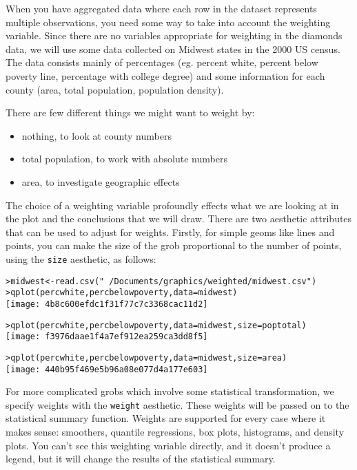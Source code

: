 When you have aggregated data where each row in the dataset represents multiple observations, you need some way to take into account the weighting variable.  Since there are no variables appropriate for weighting in the diamonds data, we will use some data collected on Midwest states in the 2000 US census.  The data consists mainly of percentages (eg. percent white, percent below poverty line, percentage with college degree) and some information for each county (area, total population, population density).

There are few different things we might want to weight by: 

\begin{itemize}
	\item nothing, to look at county numbers
	\item total population, to work with absolute numbers
	\item area, to investigate geographic effects
\end{itemize}

\noindent The choice of a weighting variable profoundly effects what we are looking at in the plot and the conclusions that we will draw.  There are two aesthetic attributes that can be used to adjust for weights.  Firstly, for simple geoms like lines and points, you can make the size of the grob proportional to the number of points, using the {\tt size} aesthetic, as follows:

\begin{alltt}
> midwest <- read.csv("~/Documents/graphics/weighted/midwest.csv")
> qplot(percwhite, percbelowpoverty, data = midwest)
\texttt{[image: 4b8c600efdc1f31f77c7c3368cac11d2]}

> qplot(percwhite, percbelowpoverty, data = midwest, size = poptotal)
\texttt{[image: f3976daae1f4a7ef912ea259ca3dd8f5]}

> qplot(percwhite, percbelowpoverty, data = midwest, size = area)
\texttt{[image: 440b95f469e5b96a08e077d4a177e603]}

\end{alltt}

For more complicated grobs which involve some statistical transformation, we specify weights with the {\tt weight} aesthetic.  These weights will be passed on to the statistical summary function.  Weights are supported for every case where it makes sense: smoothers, quantile regressions, box plots, histograms, and density plots.  You can't see this weighting variable directly, and it doesn't produce a legend, but it will change the results of the statistical summary.

